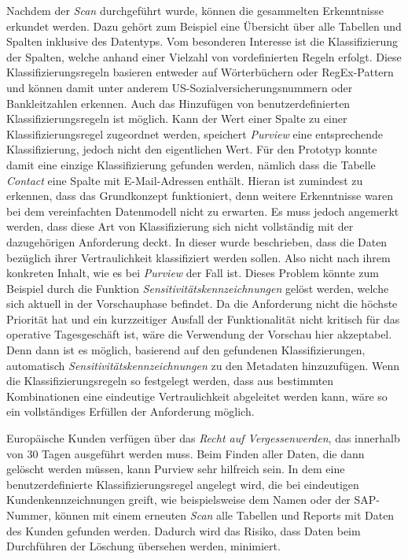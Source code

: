 Nachdem der \textit{Scan} durchgeführt wurde, können die gesammelten Erkenntnisse erkundet werden. Dazu gehört zum Beispiel eine Übersicht über alle Tabellen und Spalten inklusive des Datentyps. Vom besonderen Interesse ist die Klassifizierung der Spalten, welche anhand einer Vielzahl von vordefinierten Regeln erfolgt. Diese Klassifizierungsregeln basieren entweder auf Wörterbüchern oder RegEx-Pattern und können damit unter anderem US-Sozialversicherungsnummern oder Bankleitzahlen erkennen. Auch das Hinzufügen von benutzerdefinierten Klassifizierungsregeln ist möglich. Kann der Wert einer Spalte zu einer Klassifizierungsregel zugeordnet werden, speichert \textit{Purview} eine entsprechende Klassifizierung, jedoch nicht den eigentlichen Wert. Für den Prototyp konnte damit eine einzige Klassifizierung gefunden werden, nämlich dass die Tabelle \textit{Contact} eine Spalte mit E-Mail-Adressen enthält. Hieran ist zumindest zu erkennen, dass das Grundkonzept funktioniert, denn weitere Erkenntnisse waren bei dem vereinfachten Datenmodell nicht zu erwarten. Es muss jedoch angemerkt werden, dass diese Art von Klassifizierung sich nicht vollständig mit der dazugehörigen Anforderung deckt. In dieser wurde beschrieben, dass die  Daten bezüglich ihrer Vertraulichkeit klassifiziert werden sollen. Also nicht nach ihrem konkreten Inhalt, wie es bei \textit{Purview} der Fall ist. Dieses Problem könnte zum Beispiel durch die Funktion \textit{Sensitivitätskennzeichnungen} gelöst werden, welche sich aktuell in der Vorschauphase befindet. Da die Anforderung nicht die höchste Priorität hat und ein kurzzeitiger Ausfall der Funktionalität nicht kritisch für das operative Tagesgeschäft ist, wäre die Verwendung der Vorschau hier akzeptabel. Denn dann ist es möglich, basierend auf den gefundenen Klassifizierungen, automatisch \textit{Sensitivitätskennzeichnungen} zu den Metadaten hinzuzufügen. Wenn die Klassifizierungsregeln so festgelegt werden, dass aus bestimmten Kombinationen eine eindeutige Vertraulichkeit abgeleitet werden kann, wäre so ein vollständiges Erfüllen der Anforderung möglich. 

Europäische Kunden verfügen über das \textit{Recht auf Vergessenwerden}, das innerhalb von 30 Tagen ausgeführt werden muss. Beim Finden aller Daten, die dann gelöscht werden müssen, kann Purview sehr hilfreich sein. In dem eine benutzerdefinierte Klassifizierungsregel angelegt wird, die bei eindeutigen Kundenkennzeichnungen greift, wie beispielsweise dem Namen oder der SAP-Nummer, können mit einem erneuten \textit{Scan} alle Tabellen und Reports mit Daten des Kunden gefunden werden. Dadurch wird das Risiko, dass Daten beim Durchführen der Löschung übersehen werden, minimiert.

